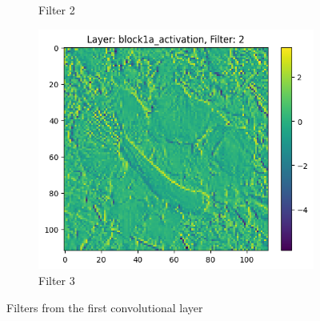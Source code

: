 \begin{figure}[h]
\begin{subfigure}[b]{0.3\textwidth}
        \caption{Filter 2}
        \label{fig:filter2}
    \end{subfigure}
    \begin{subfigure}[b]{0.3\textwidth}
        \centering
        \includegraphics[width=\textwidth]{images/filter 3block1a_activation.png}
        \caption{Filter 3}
        \label{fig:filter3}
    \end{subfigure}
    \caption{Filters from the first convolutional layer}
    \label{fig:conv_filters}
\end{figure}

